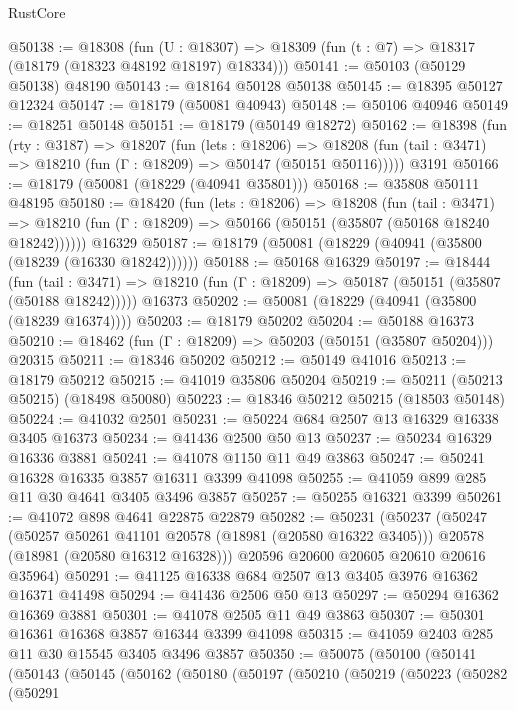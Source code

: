 \begin{lexlean}{RustCore}
\begin{coremodule}
@50138 := @18308
    (fun (U : @18307) => @18309 (fun (t : @7) => @18317 (@18179 (@18323 @48192 @18197) @18334)))
@50141 := @50103 (@50129 @50138) @48190
@50143 := @18164 @50128 @50138
@50145 := @18395 @50127 @12324
@50147 := @18179 (@50081 @40943)
@50148 := @50106 @40946
@50149 := @18251 @50148
@50151 := @18179 (@50149 @18272)
@50162 := @18398
    (fun (rty : @3187) =>
    @18207
      (fun (lets : @18206) =>
      @18208 (fun (tail : @3471) => @18210 (fun (Γ : @18209) => @50147 (@50151 @50116)))))
    @3191
@50166 := @18179 (@50081 (@18229 (@40941 @35801)))
@50168 := @35808 @50111 @48195
@50180 := @18420
    (fun (lets : @18206) =>
    @18208
      (fun (tail : @3471) =>
      @18210 (fun (Γ : @18209) => @50166 (@50151 (@35807 (@50168 @18240 @18242))))))
    @16329
@50187 := @18179 (@50081 (@18229 (@40941 (@35800 (@18239 (@16330 @18242))))))
@50188 := @50168 @16329
@50197 := @18444
    (fun (tail : @3471) => @18210 (fun (Γ : @18209) => @50187 (@50151 (@35807 (@50188 @18242)))))
    @16373
@50202 := @50081 (@18229 (@40941 (@35800 (@18239 @16374))))
@50203 := @18179 @50202
@50204 := @50188 @16373
@50210 := @18462 (fun (Γ : @18209) => @50203 (@50151 (@35807 @50204))) @20315
@50211 := @18346 @50202
@50212 := @50149 @41016
@50213 := @18179 @50212
@50215 := @41019 @35806 @50204
@50219 := @50211 (@50213 @50215) (@18498 @50080)
@50223 := @18346 @50212 @50215 (@18503 @50148)
@50224 := @41032 @2501
@50231 := @50224 @684 @2507 @13 @16329 @16338 @3405 @16373
@50234 := @41436 @2500 @50 @13
@50237 := @50234 @16329 @16336 @3881
@50241 := @41078 @1150 @11 @49 @3863
@50247 := @50241 @16328 @16335 @3857 @16311 @3399 @41098
@50255 := @41059 @899 @285 @11 @30 @4641 @3405 @3496 @3857
@50257 := @50255 @16321 @3399
@50261 := @41072 @898 @4641 @22875 @22879
@50282 := @50231
    (@50237
      (@50247
        (@50257 @50261 @41101 @20578 (@18981 (@20580 @16322 @3405)))
        @20578
        (@18981 (@20580 @16312 @16328)))
      @20596
      @20600
      @20605
      @20610
      @20616
      @35964)
@50291 := @41125 @16338 @684 @2507 @13 @3405 @3976 @16362 @16371 @41498
@50294 := @41436 @2506 @50 @13
@50297 := @50294 @16362 @16369 @3881
@50301 := @41078 @2505 @11 @49 @3863
@50307 := @50301 @16361 @16368 @3857 @16344 @3399 @41098
@50315 := @41059 @2403 @285 @11 @30 @15545 @3405 @3496 @3857
@50350 := @50075
    (@50100
      (@50141
        (@50143
          (@50145
            (@50162
              (@50180
                (@50197
                  (@50210
                    (@50219
                      (@50223
                        (@50282
                          (@50291

\end{coremodule}
\end{lexlean}
